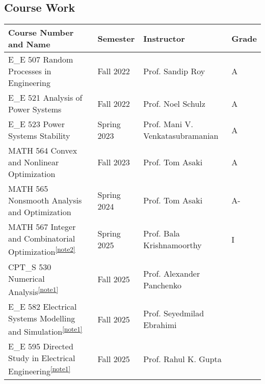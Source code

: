 \subsection{Course Work}
\begin{table}[h!]
\centering
\setlength{\tabcolsep}{4pt}
\label{tab:my-table}
\begin{adjustbox}{width=1\textwidth,center=\textwidth}
\begin{tabular}{@{}l|l|l|l@{}}
\toprule
Course Number and Name                          & Semester       & Instructor                     & Grade \\ \midrule

E\_E 507 Random Processes in Engineering        & Fall 2022      & Prof. Sandip Roy               & A    \\
E\_E 521 Analysis of Power Systems              & Fall 2022      & Prof. Noel Schulz              & A    \\
E\_E 523 Power Systems Stability                & Spring 2023    & Prof. Mani V. Venkatasubramanian & A   \\
MATH 564 Convex and Nonlinear Optimization      & Fall 2023      & Prof. Tom Asaki                & A    \\
MATH 565 Nonsmooth Analysis and Optimization    & Spring 2024    & Prof. Tom Asaki                & A-   \\
MATH 567 Integer and Combinatorial Optimization\textsuperscript{\ref{note2}} & Spring 2025    & Prof. Bala Krishnamoorthy & I \\
CPT\_S 530 Numerical Analysis\textsuperscript{\ref{note1}} & Fall 2025 & Prof. Alexander Panchenko & \\
E\_E 582 Electrical Systems Modelling and Simulation\textsuperscript{\ref{note1}} & Fall 2025 & Prof. Seyedmilad Ebrahimi & \\

E\_E 595 Directed Study in Electrical Engineering\textsuperscript{\ref{note1}} & Fall 2025 & Prof. Rahul K. Gupta & \\ \bottomrule
\end{tabular}
\end{adjustbox}


\end{table}

